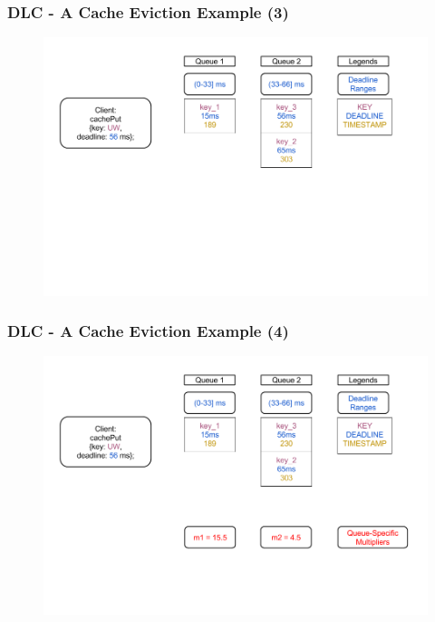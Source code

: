 \documentclass{beamer}
\begin{document}
\begin{frame}
  \frametitle{DLC - A Cache Eviction Example (3)}
  \begin{figure}
    \begin{center}
      \centerline{\includegraphics[scale=0.33]{img/DLC_V5_3.png}}
    \end{center}
  \end{figure}
\end{frame}

\begin{frame}
  \frametitle{DLC - A Cache Eviction Example (4)}
  \begin{figure}
    \begin{center}
      \centerline{\includegraphics[scale=0.33]{img/DLC_V5_4.png}}
    \end{center}
  \end{figure}
\end{frame}
\end{document}
